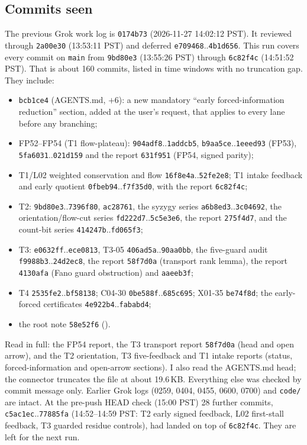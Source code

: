 \documentclass[11pt]{article}
\theoremstyle{definition}
\begin{document}
\subsection*{Commits seen}
The previous Grok work log is \texttt{0174b73} (2026-11-27 14:02:12 PST). It reviewed through \texttt{2a00e30} (13:53:11 PST) and deferred \texttt{e709468}..\texttt{4b1d656}. This run covers every commit on \texttt{main} from \texttt{9bd80e3} (13:55:26 PST) through \texttt{6c82f4c} (14:51:52 PST). That is about 160 commits, listed in time windows with no truncation gap. They include:
\begin{itemize}
\item \texttt{bcb1ce4} (AGENTS.md, $+6$): a new mandatory ``early forced-information reduction'' section, added at the user's request, that applies to every lane before any branching;
\item FP52--FP54 (T1 flow-plateau): \texttt{904adf8}..\texttt{1addcb5}, \texttt{b9aa5ce}..\texttt{1eeed93} (FP53), \texttt{5fa6031}..\texttt{021d159} and the report \texttt{631f951} (FP54, signed parity);
\item T1/L02 weighted conservation and flow \texttt{16f8e4a}..\texttt{52fe2e8}; T1 intake feedback and early quotient \texttt{0fbeb94}..\texttt{f7f35d0}, with the report \texttt{6c82f4c};
\item T2: \texttt{9bd80e3}..\texttt{7396f80}, \texttt{ac28761}, the syzygy series \texttt{a6b8ed3}..\texttt{3c04692}, the orientation/flow-cut series \texttt{fd222d7}..\texttt{5c5e3e6}, the report \texttt{275f4d7}, and the count-bit series \texttt{414247b}..\texttt{fd065f3};
\item T3: \texttt{e0632ff}..\texttt{ece0813}, T3-05 \texttt{406ad5a}..\texttt{90aa0bb}, the five-guard audit \texttt{f9988b3}..\texttt{24d2ec8}, the report \texttt{58f7d0a} (transport rank lemma), the report \texttt{4130afa} (Fano guard obstruction) and \texttt{aaeeb3f};
\item T4 \texttt{2535fe2}..\texttt{bf58138}; C04-30 \texttt{0be588f}..\texttt{685c695}; X01-35 \texttt{be74f8d}; the early-forced certificates \texttt{4e922b4}..\texttt{fababd4};
\item the root note \texttt{58e52f6} ().
\end{itemize}
Read in full: the FP54 report, the T3 transport report \texttt{58f7d0a} (head and open arrow), and the T2 orientation, T3 five-feedback and T1 intake reports (status, forced-information and open-arrow sections). I also read the AGENTS.md head; the connector truncates the file at about 19.6\,KB. Everything else was checked by commit message only. Earlier Grok logs (0259, 0404, 0455, 0600, 0700) and \texttt{code/} are intact. At the pre-push HEAD check (15:00 PST) 28 further commits, \texttt{c5ac1ec}..\texttt{77885fa} (14:52--14:59 PST: T2 early signed feedback, L02 first-stall feedback, T3 guarded residue controls), had landed on top of \texttt{6c82f4c}. They are left for the next run.
\end{document}
